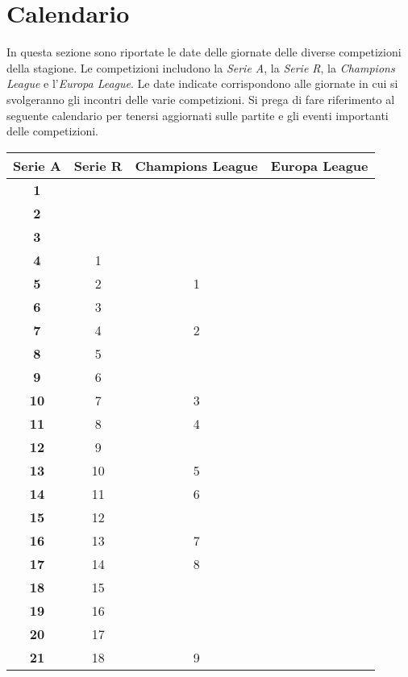 \documentclass[12pt]{article}
\begin{document}
\section{Calendario}
In questa sezione sono riportate le date delle giornate delle diverse competizioni della stagione. Le competizioni includono la \textit{Serie A}, la \textit{Serie R}, la \textit{Champions League} e l'\textit{Europa League}. Le date indicate corrispondono alle giornate in cui si svolgeranno gli incontri delle varie competizioni. Si prega di fare riferimento al seguente calendario per tenersi aggiornati sulle partite e gli eventi importanti delle competizioni.
\newline
\\
\newpage
\thispagestyle{empty}
\begin{tabular}{|c|c|c|c|}
    \hline
    \textbf{Serie A} & \textbf{Serie R} & \textbf{Champions League} & \textbf{Europa League} \\
    \hline
    \textbf{1} &  &  &  \\
    \hline
    \textbf{2} &  &  &  \\
    \hline
    \textbf{3} &  &  &  \\
    \hline
    \textbf{4} & 1  &  &  \\
    \hline
    \textbf{5} & 2 & 1 &  \\
    \hline
    \textbf{6} & 3 &  &  \\
    \hline
    \textbf{7} & 4 & 2 &  \\
    \hline
    \textbf{8} & 5 &  &  \\
    \hline
    \textbf{9} & 6 &  &  \\
    \hline
    \textbf{10} & 7 & 3 &  \\
    \hline
    \textbf{11} & 8 & 4 &  \\
    \hline
    \textbf{12} & 9 &  &  \\
    \hline
    \textbf{13} & 10 & 5 &  \\
    \hline
    \textbf{14} & 11 & 6 &  \\
    \hline
    \textbf{15} & 12 &  &  \\
    \hline
    \textbf{16} & 13 & 7 &  \\
    \hline
    \textbf{17} & 14 & 8 &  \\
    \hline
    \textbf{18} & 15 &  &  \\
    \hline
    \textbf{19} & 16 &  &  \\
    \hline
    \textbf{20} & 17 &  &  \\
    \hline
    \textbf{21} & 18 & 9 &  \\

\end{tabular}
\end{document}
